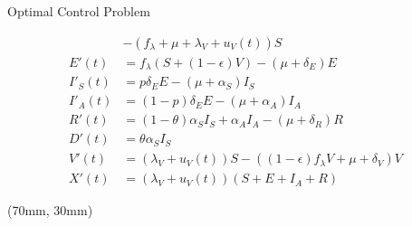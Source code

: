 \begin{frame}{Optimal Control Problem}
\begin{textblock*}{85mm}
{\begin{equation*}
\begin{aligned}
                    &-
                    (f_{\lambda} + \mu + \lambda_V +  u_V(t)) S
                    \\
                    E'(t)
                    &=
                    f_{\lambda} (S + (1-\epsilon) V)
                    - (\mu+\delta_E) E
                    \\
                    I'_S(t)
                    &=p
                    \delta_E
                    E-(\mu + \alpha_S) I_S
                    \\
                    I'_A(t)
                    &= (1 - p) \delta_E E-(\mu + \alpha_A) I_A
                    \\
                    R'(t)
                    &= (1 - \theta) \alpha_S I_S + \alpha_A I_A
                    - (\mu + \delta_R) R
                    \\
                    D'(t)&=
                    \theta \alpha_S I_S
                    \\
                    V'(t)&=
                    (\lambda_V + u_V(t)) S -
                    \left(
                    (1 -\epsilon) f_{\lambda} V +
                    \mu + \delta_V
                    \right) V
                    \\
                    X'(t)&=
                    (\lambda_V + u_V(t))(S + E + I_A + R)           
                \end{aligned}
            \end{equation*}
        }
    \end{textblock*}
%
    \begin{textblock*}{60mm}(70mm, 30mm)
    \end{textblock*}
\end{frame}